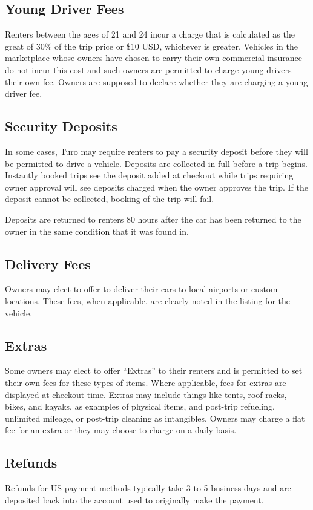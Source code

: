 \documentclass[review,12pt]{elsarticle}
\begin{document}
  \subsection{Young Driver Fees}
  Renters between the ages of 21 and 24 incur a charge that is calculated as the great of 30\% of the trip price or \$10 USD, whichever is greater. Vehicles in the marketplace whose owners have chosen to carry their own commercial insurance do not incur this cost and such owners are permitted to charge young drivers their own fee. Owners are supposed to declare whether they are charging a young driver fee.

  \subsection{Security Deposits}
  In some cases, Turo may require renters to pay a security deposit before they will be permitted to drive a vehicle. Deposits are collected in full before a trip begins. Instantly booked trips see the deposit added at checkout while trips requiring owner approval will see deposits charged when the owner approves the trip. If the deposit cannot be collected, booking of the trip will fail.

  Deposits are returned to renters 80 hours after the car has been returned to the owner in the same condition that it was found in.

  \subsection{Delivery Fees}
  Owners may elect to offer to deliver their cars to local airports or custom locations. These fees, when applicable, are clearly noted in the listing for the vehicle.

  \subsection{Extras}
  Some owners may elect to offer ``Extras'' to their renters and is permitted to set their own fees for these types of items. Where applicable, fees for extras are displayed at checkout time. Extras may include things like tents, roof racks, bikes, and kayaks, as examples of physical items, and post-trip refueling, unlimited mileage, or post-trip cleaning as intangibles. Owners may charge a flat fee for an extra or they may choose to charge on a daily basis.

  \subsection{Refunds}
  Refunds for US payment methods typically take 3 to 5 business days and are deposited back into the account used to originally make the payment.
\end{document}
